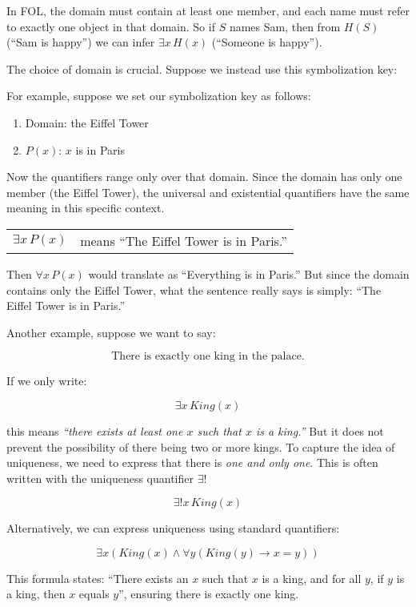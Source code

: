 \documentclass[12pt,a4paper,openany]{article}
\begin{document}
In FOL, the domain must contain at least one member, and each name must
refer to exactly one object in that domain. So if \(S\) names Sam, then
from \(H(S)\) (``Sam is happy'') we can infer \(\exists x \, H(x)\)
(``Someone is happy'').

The choice of domain is crucial. Suppose we instead use this
symbolization key:

For example, suppose we set our symbolization key as follows:

\begin{enumerate}
    \item Domain: the Eiffel Tower
    \item $P(x)$: $x$ is in Paris
\end{enumerate}

Now the quantifiers range only over that domain. Since the domain has only one member (the Eiffel Tower), the universal and existential quantifiers have the same meaning in this specific context.

\begin{center}
\begin{tabular}{ll}
$\exists x \, P(x)$ & means ``The Eiffel Tower is in Paris.''
\end{tabular}
\end{center}

Then \(\forall x \, P(x)\) would translate as ``Everything is in
Paris.'' But since the domain contains only the Eiffel Tower, what the
sentence really says is simply: ``The Eiffel Tower is in Paris.''

Another example, suppose we want to say:

\[\text{There is exactly one king in the palace.}\]

If we only write:

\[\exists x \, King(x)\]

this means \emph{``there exists at least one \(x\) such that \(x\) is a
king.''} But it does not prevent the possibility of there being two or
more kings. To capture the idea of uniqueness, we need to express that
there is \emph{one and only one}. This is often written with the
uniqueness quantifier \(\exists!\)

\[\exists! x \, King(x)\]

Alternatively, we can express uniqueness using standard quantifiers:

\[\exists x (King(x) \land \forall y (King(y) \rightarrow x = y))\]

This formula states: ``There exists an \(x\) such that \(x\) is a king,
and for all \(y\), if \(y\) is a king, then \(x\) equals \(y\)'',
ensuring there is exactly one king.
\end{document}
